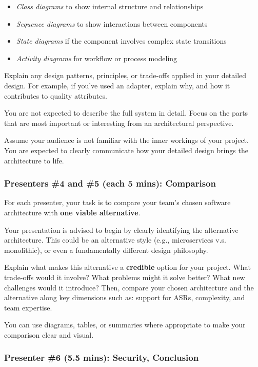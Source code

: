 \documentclass{csse4400}
\begin{document}
\begin{itemize}
    \item \emph{Class diagrams} to show internal structure and relationships
    \item \emph{Sequence diagrams} to show interactions between components
    \item \emph{State diagrams} if the component involves complex state transitions
    \item \emph{Activity diagrams} for workflow or process modeling
\end{itemize}

Explain any design patterns, principles, or trade-offs applied in your detailed design. For example, if you've used an adapter, explain why, and how it contributes to quality attributes.

You are not expected to describe the full system in detail. Focus on the parts that are most important or interesting from an architectural perspective.

Assume your audience is not familiar with the inner workings of your project. You are expected to clearly communicate how your detailed design brings the architecture to life.


\subsubsection{Presenters \#4 and \#5 (each 5 mins): Comparison}

For each presenter, your task is to compare your team's chosen software architecture with \textbf{one viable alternative}.

Your presentation is advised to begin by clearly identifying the alternative architecture. This could be an alternative style (e.g., microservices v.s. monolithic), or even a fundamentally different design philosophy.

Explain what makes this alternative a \textbf{credible} option for your project. What trade-offs would it involve? What problems might it solve better? What new challenges would it introduce?
Then, compare your chosen architecture and the alternative along key dimensions such as: support for ASRs, complexity, and team expertise.

You can use diagrams, tables, or summaries where appropriate to make your comparison clear and visual.


\subsubsection{Presenter \#6 (5.5 mins): Security, Conclusion}
\end{document}
